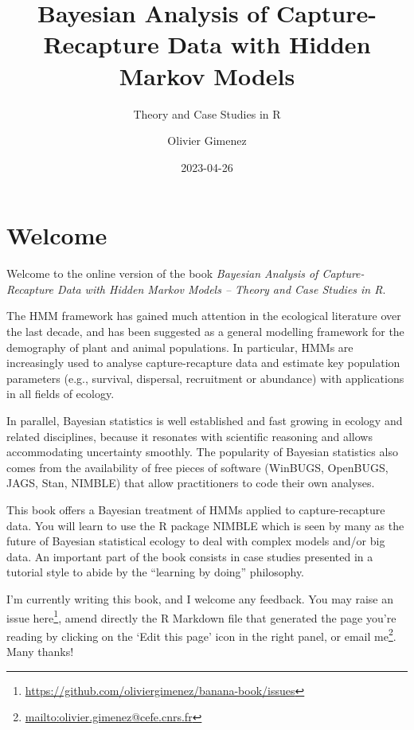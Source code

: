 \documentclass[
  12pt,
]{krantz}
\title{Bayesian Analysis of Capture-Recapture Data with Hidden Markov Models}
\subtitle{Theory and Case Studies in R}
\author{Olivier Gimenez}
\date{2023-04-26}
\renewcommand{\href}[2]{#2\footnote{\url{#1}}}
\begin{document}
\maketitle

\thispagestyle{empty}

\setlength{\abovedisplayskip}{-5pt}
\setlength{\abovedisplayshortskip}{-5pt}

{
\hypersetup{linkcolor=}
\setcounter{tocdepth}{2}
\tableofcontents
}
\listoffigures
\listoftables
\hypertarget{welcome}{%
\chapter*{Welcome}\label{welcome}}


Welcome to the online version of the book \emph{Bayesian Analysis of Capture-Recapture Data with Hidden Markov Models -- Theory and Case Studies in R}.

The HMM framework has gained much attention in the ecological literature over the last decade, and has been suggested as a general modelling framework for the demography of plant and animal populations. In particular, HMMs are increasingly used to analyse capture-recapture data and estimate key population parameters (e.g., survival, dispersal, recruitment or abundance) with applications in all fields of ecology.

In parallel, Bayesian statistics is well established and fast growing in ecology and related disciplines, because it resonates with scientific reasoning and allows accommodating uncertainty smoothly. The popularity of Bayesian statistics also comes from the availability of free pieces of software (WinBUGS, OpenBUGS, JAGS, Stan, NIMBLE) that allow practitioners to code their own analyses.

This book offers a Bayesian treatment of HMMs applied to capture-recapture data. You will learn to use the R package NIMBLE which is seen by many as the future of Bayesian statistical ecology to deal with complex models and/or big data. An important part of the book consists in case studies presented in a tutorial style to abide by the ``learning by doing'' philosophy.

I'm currently writing this book, and I welcome any feedback. You may raise an issue \href{https://github.com/oliviergimenez/banana-book/issues}{here}, amend directly the R Markdown file that generated the page you're reading by clicking on the `Edit this page' icon in the right panel, or \href{mailto:olivier.gimenez@cefe.cnrs.fr}{email me}. Many thanks!
\end{document}
